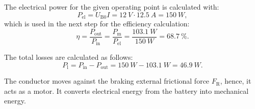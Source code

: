 
\begin{solutionblock}
    The electrical power for the given operating point is calculated with:
    \begin{equation}
        P_{\mathrm{el}} = U_{\mathrm{B0}} I
        = 12 \ \si{V} \cdot 12.5 \ \si{A}
        = 150 \ \si{W},
    \end{equation}
    which is used in the next step for the efficiency calculation:
    \begin{equation}
        \eta = \frac{P_{\mathrm{out}}}{P_{\mathrm{in}}}
        = \frac{P_{\mathrm{m}}}{P_{\mathrm{el}}}
        = \frac{103.1 \ \si{W}}{150 \ \si{W}}
        = 68.7 \ \si{\%}.
    \end{equation}

    The total losses are calculated as follows:
    \begin{equation}
        P_{\mathrm{l}} = P_{\mathrm{in}} - P_{\mathrm{out}}
        = 150 \ \si{W} - 103.1 \ \si{W}
        = 46.9 \ \si{W}.
    \end{equation}

    The conductor moves against the braking external frictional force $F_{\mathrm{R}}$, hence, it acts as a motor. It converts electrical energy from the battery into mechanical energy.

\end{solutionblock}

